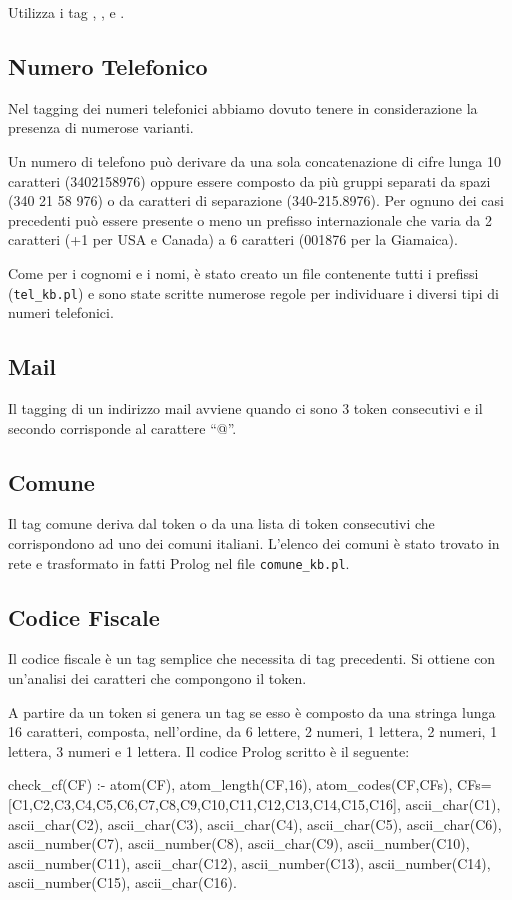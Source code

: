 Utilizza i tag , , e .

\subsection{Numero Telefonico}
Nel tagging dei numeri telefonici abbiamo dovuto tenere in considerazione la presenza di numerose varianti.

Un numero di telefono può derivare da una sola concatenazione di cifre lunga 10 caratteri (3402158976) oppure essere composto da più gruppi separati da spazi (340 21 58 976) o da caratteri di separazione (340-215.8976). Per ognuno dei casi precedenti può essere presente o meno un prefisso internazionale che varia da 2 caratteri (+1 per USA e Canada) a 6 caratteri (001876 per la Giamaica).

Come per i cognomi e i nomi, è stato creato un file contenente tutti i prefissi (\verb|tel_kb.pl|) e sono state scritte numerose regole per individuare i diversi tipi di numeri telefonici.

\subsection{Mail}
Il tagging di un indirizzo mail avviene quando ci sono 3 token consecutivi e il secondo corrisponde al carattere ``@''.

\subsection{Comune}
Il tag comune deriva dal token o da una lista di token consecutivi che corrispondono ad uno dei comuni italiani. L'elenco dei comuni è stato trovato in rete e trasformato in fatti Prolog nel file \verb|comune_kb.pl|.

\subsection{Codice Fiscale}
Il codice fiscale è un tag semplice che necessita di tag precedenti. Si ottiene con un'analisi dei caratteri che compongono il token.

A partire da un token si genera un tag  se esso è composto da una stringa lunga 16 caratteri, composta, nell'ordine, da 6 lettere, 2 numeri, 1 lettera, 2 numeri, 1 lettera, 3 numeri e 1 lettera.
\clearpage
Il codice Prolog scritto è il seguente:

\begin{prologcode}
check_cf(CF) :-
  atom(CF),
  atom_length(CF,16),
  atom_codes(CF,CFs),
  CFs=[C1,C2,C3,C4,C5,C6,C7,C8,C9,C10,C11,C12,C13,C14,C15,C16],
  ascii_char(C1),
  ascii_char(C2),
  ascii_char(C3),
  ascii_char(C4),
  ascii_char(C5),
  ascii_char(C6),
  ascii_number(C7),
  ascii_number(C8),
  ascii_char(C9),
  ascii_number(C10),
  ascii_number(C11),
  ascii_char(C12),
  ascii_number(C13),
  ascii_number(C14),
  ascii_number(C15),
  ascii_char(C16).
\end{prologcode}